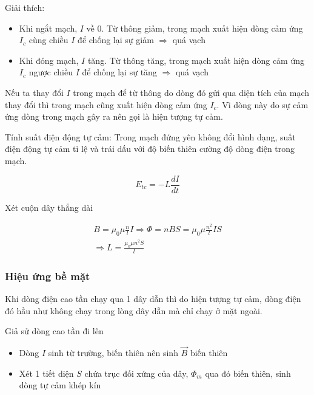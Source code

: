 Giải thích:

\begin{itemize}
  \item Khi ngắt mạch, $I$ về 0. Từ thông giảm, trong mạch xuất hiện dòng cảm ứng $I_c$ cùng chiều $I$ để chống lại sự giảm $\Rightarrow$ quá vạch
  \item Khi đóng mạch, $I$ tăng. Từ thông tăng, trong mạch xuất hiện dòng cảm ứng $I_c$ ngược chiều $I$ để chống lại sự tăng $\Rightarrow$ quá vạch
\end{itemize}

Nếu ta thay đổi $I$ trong mạch để từ thông do dòng đó gửi qua diện tích của mạch thay đổi thì trong mạch cũng xuất hiện dòng cảm ứng $I_c$. Vì dòng này do sự cảm ứng dòng trong mạch gây ra nên gọi là hiện tượng tự cảm.

Tính suất điện động tự cảm: Trong mạch đứng yên không đổi hình dạng, suất điện động tự cảm tỉ lệ và trái dấu với độ biến thiên cường độ dòng điện trong mạch.

\begin{equation*}
  E_{tc} = -L\frac{dI}{dt}
\end{equation*}

Xét cuộn dây thẳng dài 

\begin{gather*}
  B = \mu_0\mu \frac{n}{l}I \Rightarrow \Phi = nBS = \mu_0\mu \frac{n^2}{l} IS \\
  \Rightarrow L = \frac{\mu_0\mu n^2 S}{l}
\end{gather*}

\subsubsection{Hiệu ứng bề mặt}

Khi dòng điện cao tần chạy qua 1 dây dẫn thì do hiện tượng tự cảm, dòng điện đó hầu như không chạy trong lòng dây dẫn mà chỉ chạy ở mặt ngoài.

\newpage

\begin{figure*}[h]
  \centering
  \qquad
\end{figure*}

Giả sử dòng cao tần đi lên

\begin{itemize}
  \item Dòng $I$ sinh từ trường, biến thiên nên sinh $\vec{B}$ biến thiên
  \item Xét 1 tiết diện $S$ chứa trục đối xứng của dây, $\Phi_m$ qua đó biến thiên, sinh dòng tự cảm khép kín
\end{itemize}

